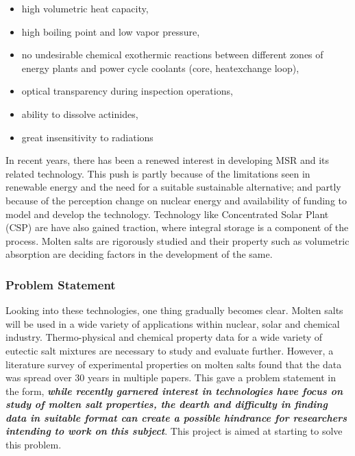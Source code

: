 \begin{itemize}
  \item high volumetric heat capacity,
 \item high boiling point and low vapor pressure,
 \item no undesirable chemical exothermic reactions between different zones of energy plants and power cycle coolants (core, heatexchange loop),
 \item optical transparency during inspection operations,
 \item ability to dissolve actinides,
 \item great insensitivity to radiations
 
\end{itemize}

In recent years, there has been a renewed interest in developing MSR and its related technology. This push is partly because of the limitations seen in renewable energy and the need for a suitable sustainable alternative; and partly because of the perception change on nuclear energy and availability of funding to model and develop the technology. Technology like Concentrated Solar Plant (CSP) are have also gained traction, where integral storage is a component of the process. Molten salts are rigorously studied and their property such as volumetric absorption are deciding factors in the development of the same\cite{slocum2011a}. \newline

\subsubsection{\textbf{Problem Statement}}
Looking into these technologies, one thing gradually becomes clear. Molten salts will be used in a wide variety of applications within nuclear, solar and chemical industry. Thermo-physical and chemical property data for a wide variety of eutectic salt mixtures are necessary to study and evaluate further. However, a literature survey of experimental properties on molten salts found that the data was spread over 30 years in multiple papers. This gave a problem statement in the form, \textbf{\textit{while recently garnered interest in technologies have focus on study of molten salt properties, the dearth and difficulty in finding data in suitable format can create a possible hindrance for researchers intending to work on this subject}}. This project is aimed at starting to solve this problem.  \newline

